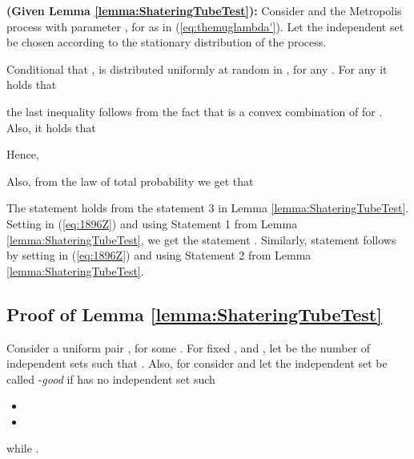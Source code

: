 \documentclass[a4paper,10pt]{article}
\makeatletter
\newenvironment{lemmaproof}[1]{\noindent{\bf Proof of Lemma #1\@}}{\hfill \\}
\makeatother
\begin{document}
\begin{lemmaproof}{\ref{lemma:ShateringTube}}
{\bf (Given Lemma \ref{lemma:ShateringTubeTest}):}
Consider  and the Metropolis process with parameter 
, for  as in (\ref{eq:themuglambda'}).
Let the independent set  be chosen according to 
the stationary distribution of the process. 

Conditional that ,  is distributed
uniformly at random in , for any .
For any  it holds that

the last inequality follows from the fact that 
is a convex combination of  for .
Also, it holds  that

Hence,

Also, from the law of total probability we get that

\noindent
The statement   holds  from the statement 3 in Lemma
\ref{lemma:ShateringTubeTest}. Setting    in (\ref{eq:1896Z})
and using Statement 1 from Lemma \ref{lemma:ShateringTubeTest}, we
get the statement . Similarly, statement 
follows by setting  in (\ref{eq:1896Z})
and  using Statement 2  from Lemma \ref{lemma:ShateringTubeTest}.
\end{lemmaproof}



\subsection{Proof of Lemma \ref{lemma:ShateringTubeTest}}

Consider a uniform pair , for some
. For fixed , and , let  be the number of independent sets  such that . Also, for 
consider   and let the independent
set  be called -{\em good} if
 has no independent set  such 
\begin{itemize}
	\item 
	\item 
\end{itemize}
while .
\end{document}
